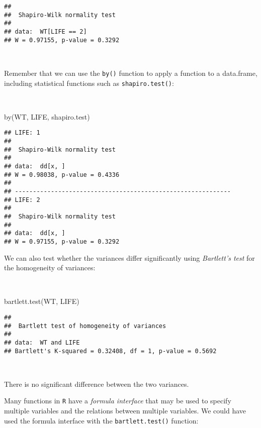 \documentclass[
  12pt,
  a4paper]{book}
\newenvironment{Shaded}{\begin{snugshade}}{\end{snugshade}}
\newcommand{\FunctionTok}[1]{\textcolor[rgb]{0.00,0.00,0.00}{#1}}
\newcommand{\NormalTok}[1]{#1}
\begin{document}
\begin{verbatim}
## 
##  Shapiro-Wilk normality test
## 
## data:  WT[LIFE == 2]
## W = 0.97155, p-value = 0.3292
\end{verbatim}

~

Remember that we can use the \texttt{by()} function to apply a function to a data.frame, including statistical functions such as \texttt{shapiro.test()}:

~

\begin{Shaded}
\begin{Highlighting}[]
\FunctionTok{by}\NormalTok{(WT, LIFE, shapiro.test)}
\end{Highlighting}
\end{Shaded}

\begin{verbatim}
## LIFE: 1
## 
##  Shapiro-Wilk normality test
## 
## data:  dd[x, ]
## W = 0.98038, p-value = 0.4336
## 
## ------------------------------------------------------------ 
## LIFE: 2
## 
##  Shapiro-Wilk normality test
## 
## data:  dd[x, ]
## W = 0.97155, p-value = 0.3292
\end{verbatim}

\newpage

We can also test whether the variances differ significantly using \emph{Bartlett's test} for the homogeneity of variances:

~

\begin{Shaded}
\begin{Highlighting}[]
\FunctionTok{bartlett.test}\NormalTok{(WT, LIFE)}
\end{Highlighting}
\end{Shaded}

\begin{verbatim}
## 
##  Bartlett test of homogeneity of variances
## 
## data:  WT and LIFE
## Bartlett's K-squared = 0.32408, df = 1, p-value = 0.5692
\end{verbatim}

~

There is no significant difference between the two variances.

Many functions in \texttt{R} have a \emph{formula interface} that may be used to specify multiple variables and the relations between multiple variables. We could have used the formula interface with the \texttt{bartlett.test()} function:

~
\end{document}
